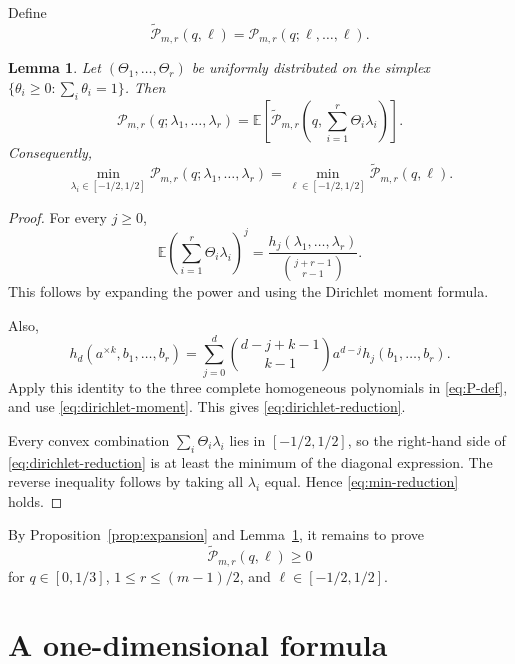 \documentclass[11pt]{article}
\numberwithin{equation}{section}
\newtheorem{lemma}[theorem]{Lemma}
\newcommand{\E}{\mathbb E}
\newcommand{\Pcal}{\mathcal P}
\newcommand{\wtP}{\widetilde{\mathcal P}}
\begin{document}
Define
\[
        \wtP_{m,r}(q,\ell)
        =\Pcal_{m,r}(q;\ell,\ldots,\ell).
\]

\begin{lemma}\label{lem:dirichlet}
Let $(\Theta_1,\ldots,\Theta_r)$ be uniformly distributed on the simplex $\{\theta_i\ge0:\sum_i\theta_i=1\}$. Then
\begin{equation}\label{eq:dirichlet-reduction}
 \Pcal_{m,r}(q;\lambda_1,\ldots,\lambda_r)
 =\E\left[
 \wtP_{m,r}\left(q,\sum_{i=1}^r\Theta_i\lambda_i\right)
 \right].
\end{equation}
Consequently,
\begin{equation}\label{eq:min-reduction}
 \min_{\lambda_i\in[-1/2,1/2]}
 \Pcal_{m,r}(q;\lambda_1,\ldots,\lambda_r)
 =\min_{\ell\in[-1/2,1/2]}\wtP_{m,r}(q,\ell).
\end{equation}
\end{lemma}

\begin{proof}
For every $j\ge0$,
\begin{equation}\label{eq:dirichlet-moment}
 \E\left(\sum_{i=1}^r\Theta_i\lambda_i\right)^j
 =\frac{h_j(\lambda_1,\ldots,\lambda_r)}{\binom{j+r-1}{r-1}}.
\end{equation}
This follows by expanding the power and using the Dirichlet moment formula.

Also,
\[
 h_d(a^{\times k},b_1,\ldots,b_r)
 =\sum_{j=0}^d\binom{d-j+k-1}{k-1}a^{d-j}h_j(b_1,\ldots,b_r).
\]
Apply this identity to the three complete homogeneous polynomials in \eqref{eq:P-def}, and use \eqref{eq:dirichlet-moment}. This gives \eqref{eq:dirichlet-reduction}.

Every convex combination $\sum_i\Theta_i\lambda_i$ lies in $[-1/2,1/2]$, so the right-hand side of \eqref{eq:dirichlet-reduction} is at least the minimum of the diagonal expression. The reverse inequality follows by taking all $\lambda_i$ equal. Hence \eqref{eq:min-reduction} holds.
\end{proof}

By Proposition~\ref{prop:expansion} and Lemma~\ref{lem:dirichlet}, it remains to prove
\begin{equation}\label{eq:diagonal-goal}
        \wtP_{m,r}(q,\ell)\ge0
\end{equation}
for $q\in[0,1/3]$, $1\le r\le(m-1)/2$, and $\ell\in[-1/2,1/2]$.

\section{A one-dimensional formula}
\end{document}
